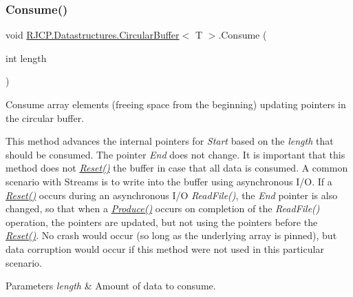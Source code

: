 \subsubsection{\texorpdfstring{Consume()}{Consume()}}
{\footnotesize\ttfamily void \mbox{\hyperlink{class_r_j_c_p_1_1_datastructures_1_1_circular_buffer}{R\+J\+C\+P.\+Datastructures.\+Circular\+Buffer}}$<$ T $>$.Consume (\begin{DoxyParamCaption}\item[{int}]{length }\end{DoxyParamCaption})}



Consume array elements (freeing space from the beginning) updating pointers in the circular buffer. 

This method advances the internal pointers for {\itshape Start} based on the {\itshape length} that should be consumed. The pointer {\itshape End} does not change. It is important that this method does not {\itshape \mbox{\hyperlink{class_r_j_c_p_1_1_datastructures_1_1_circular_buffer_af41b02f6c8de83e723a7116525c7c182}{Reset()}}} the buffer in case that all data is consumed. A common scenario with Streams is to write into the buffer using asynchronous I/O. If a {\itshape \mbox{\hyperlink{class_r_j_c_p_1_1_datastructures_1_1_circular_buffer_af41b02f6c8de83e723a7116525c7c182}{Reset()}}} occurs during an asynchronous I/O {\itshape Read\+File()}, the {\itshape End} pointer is also changed, so that when a {\itshape \mbox{\hyperlink{class_r_j_c_p_1_1_datastructures_1_1_circular_buffer_aaca74dd28d174ddb86e0b8548a676889}{Produce()}}} occurs on completion of the {\itshape Read\+File()} operation, the pointers are updated, but not using the pointers before the {\itshape \mbox{\hyperlink{class_r_j_c_p_1_1_datastructures_1_1_circular_buffer_af41b02f6c8de83e723a7116525c7c182}{Reset()}}}. No crash would occur (so long as the underlying array is pinned), but data corruption would occur if this method were not used in this particular scenario. 


\begin{DoxyParams}{Parameters}
{\em length} & Amount of data to consume.\\
\hline
\end{DoxyParams}
\mbox{\label{class_r_j_c_p_1_1_datastructures_1_1_circular_buffer_a71e329c44fe7e70277066977fa930c08}} 
